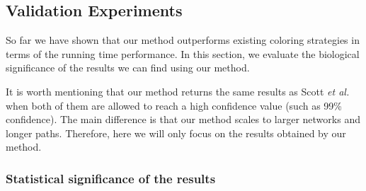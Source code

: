 \subsection{Validation Experiments}
\label{sec:validation}


So far we have shown that our method outperforms existing coloring
strategies in terms of the running time performance. In this section,
we evaluate the biological significance of the results we can find
using our method. 

It is worth mentioning that our method returns the same results as
Scott {\it et al.}~\cite{scott} when both of them are allowed to reach
a high confidence value (such as 99\% confidence). The main difference
is that our method scales to larger networks and longer paths.
Therefore, here we will only focus on the results obtained by our
method.


\subsubsection{Statistical significance of the results}
\label{sec:zscore}

